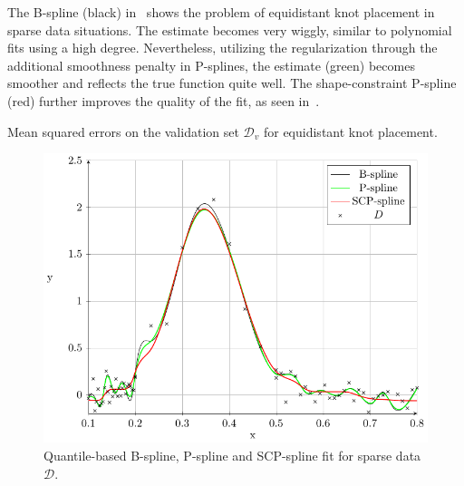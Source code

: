 The B-spline (black) in~ shows the problem of equidistant knot placement in sparse data situations. The estimate becomes very wiggly, similar to polynomial fits using a high degree. Nevertheless, utilizing the regularization through the additional smoothness penalty in P-splines, the estimate (green) becomes smoother and reflects the true function quite well. The shape-constraint P-spline (red) further improves the quality of the fit, as seen in~. 

\begin{table}[H]
	\begin{center}
	\end{center}
	\caption{Mean squared errors on the validation set $\mathcal{D}_v$ for equidistant knot placement.}
	\label{tab:sparse-example-equidistant}
\end{table}


\begin{figure}[H]
	\centering
	\includegraphics{graphics/pgfplots/cha4/exp-sparse-quantile.pdf}
	\caption{Quantile-based B-spline, P-spline and SCP-spline fit for sparse data $\mathcal{D}$.}
	\label{fig:sparse-example-quantile}
\end{figure}

